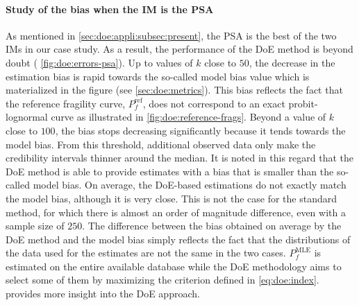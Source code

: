 \paragraph{Study of the bias when the IM is the PSA}
As mentioned in \cref{sec:doe:appli:subsec:present}, the PSA is the best of the two IMs in our case study. As a result, the performance of the DoE method is beyond doubt ( \cref{fig:doe:errors-psa}). Up to values of $k$ close to $50$, the decrease in the estimation bias is rapid towards the so-called model bias value which is materialized in the figure (see \cref{sec:doe:metrics}). This bias reflects the fact that the reference fragility curve, $P_f^{\text{ref}}$, does not correspond to an exact probit-lognormal curve as illustrated in  \cref{fig:doe:reference-frags}. Beyond a value of $k$ close to $100$, the bias stops decreasing significantly because it tends towards the model bias. From this threshold, additional observed data only make the credibility intervals thinner around the median. It is noted in this regard that the DoE method is able to provide estimates with a bias that is smaller than the so-called model bias. On average, the DoE-based estimations do not exactly match the model bias, although it is very close. This is not the case for the standard method, for which there is almost an order of magnitude difference, even with a sample size of $250$. The difference between the bias obtained on average by the DoE method and the model bias simply reflects the fact that the distributions of the data used for the estimates are not the same in the two cases. $P_f^{\text{MLE}}$ is estimated on the entire available database while the DoE methodology aims to select some of them by maximizing the criterion defined in \cref{eq:doe:index}.  provides more insight into the DoE approach.

